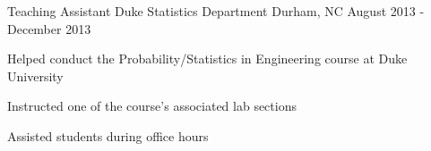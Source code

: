 \documentclass[11pt, a4paper]{awesome-cv}
\begin{document}
\begin{cventries}
  \cventry
    {Teaching Assistant}
    {Duke Statistics Department}
    {Durham, NC}
    {August 2013 - December 2013}
    {
      \begin{cvitems}
        \item{Helped conduct the Probability/Statistics in Engineering course at Duke University}
        \item{Instructed one of the course’s associated lab sections}
        \item{Assisted students during office hours}
      \end{cvitems} 
    }

\end{cventries}
\end{document}

